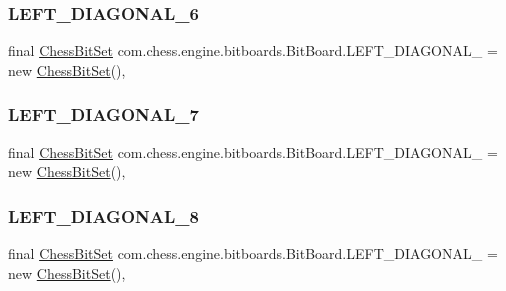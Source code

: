 \subsubsection{\texorpdfstring{LEFT\_DIAGONAL\_6}{LEFT\_DIAGONAL\_6}}
{\footnotesize\ttfamily final \mbox{\hyperlink{classcom_1_1chess_1_1engine_1_1bitboards_1_1_chess_bit_set}{Chess\+Bit\+Set}} com.\+chess.\+engine.\+bitboards.\+Bit\+Board.\+L\+E\+F\+T\+\_\+\+D\+I\+A\+G\+O\+N\+A\+L\+\_ = new \mbox{\hyperlink{classcom_1_1chess_1_1engine_1_1bitboards_1_1_chess_bit_set}{Chess\+Bit\+Set}}()\hspace{0.3cm}{\ttfamily [static]}, {\ttfamily [package]}}

\mbox{\label{classcom_1_1chess_1_1engine_1_1bitboards_1_1_bit_board_a7aaf2f2560b103c6e9e4800a36921597}} 
\subsubsection{\texorpdfstring{LEFT\_DIAGONAL\_7}{LEFT\_DIAGONAL\_7}}
{\footnotesize\ttfamily final \mbox{\hyperlink{classcom_1_1chess_1_1engine_1_1bitboards_1_1_chess_bit_set}{Chess\+Bit\+Set}} com.\+chess.\+engine.\+bitboards.\+Bit\+Board.\+L\+E\+F\+T\+\_\+\+D\+I\+A\+G\+O\+N\+A\+L\+\_ = new \mbox{\hyperlink{classcom_1_1chess_1_1engine_1_1bitboards_1_1_chess_bit_set}{Chess\+Bit\+Set}}()\hspace{0.3cm}{\ttfamily [static]}, {\ttfamily [package]}}

\mbox{\label{classcom_1_1chess_1_1engine_1_1bitboards_1_1_bit_board_a2e7180090f80f4bf33eef9dfe2e5368e}} 
\subsubsection{\texorpdfstring{LEFT\_DIAGONAL\_8}{LEFT\_DIAGONAL\_8}}
{\footnotesize\ttfamily final \mbox{\hyperlink{classcom_1_1chess_1_1engine_1_1bitboards_1_1_chess_bit_set}{Chess\+Bit\+Set}} com.\+chess.\+engine.\+bitboards.\+Bit\+Board.\+L\+E\+F\+T\+\_\+\+D\+I\+A\+G\+O\+N\+A\+L\+\_ = new \mbox{\hyperlink{classcom_1_1chess_1_1engine_1_1bitboards_1_1_chess_bit_set}{Chess\+Bit\+Set}}()\hspace{0.3cm}{\ttfamily [static]}, {\ttfamily [package]}}

